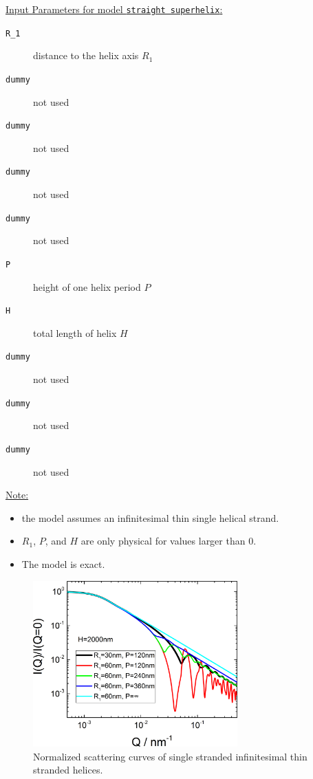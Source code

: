 \vspace{5mm}

\underline{Input Parameters for model \texttt{straight superhelix}:}\\
\begin{description}
\item[\texttt{R\_1}] distance to the helix axis $R_1$
\item[\texttt{dummy}] not used
\item[\texttt{dummy}] not used
\item[\texttt{dummy}] not used
\item[\texttt{dummy}] not used
\item[\texttt{P}] height of one helix period $P$
\item[\texttt{H}] total length of helix $H$
\item[\texttt{dummy}] not used
\item[\texttt{dummy}] not used
\item[\texttt{dummy}] not used
\end{description}

\noindent\underline{Note:}
\begin{itemize}
\item the model assumes an infinitesimal thin single helical strand.
\item $R_1$, $P$, and $H$ are only physical for values larger than 0.
\item The model is exact.
\end{itemize}

\begin{figure}[htb]
\begin{center}
\includegraphics[width=0.7\textwidth]{../images/form_factor/cylindrical_obj/helix_straightIQ.png}
\end{center}
\caption{Normalized scattering curves of single stranded infinitesimal thin stranded helices.}
\label{fig:helixstraightIQ}
\end{figure}

